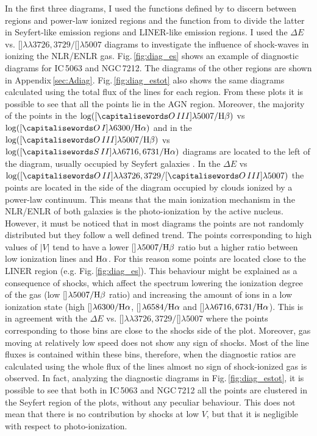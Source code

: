 \documentclass[../thesis.tex]{subfiles}
\begin{document}
In the first three diagrams, I used the functions defined by \citet{Kewley01} to discern between  regions and power-law ionized regions and the function from \citet{Kewley06} to divide the latter in Seyfert-like emission regions and LINER-like emission regions.
I used the $\Delta E$ vs. []$\lambda\lambda3726,3729/$[]$\lambda5007$ diagrams to investigate the influence of shock-waves in ionizing the NLR/ENLR gas.
Fig.\,\ref{fig:diag_es} shows an example of diagnostic diagrams for IC\,5063 and NGC\,7212.
The diagrams of the other regions are shown in Appendix\,\ref{sec:Adiag}.
Fig.\,\ref{fig:diag_estot} also shows the same diagrams calculated using the total flux of the lines for each region.
From these plots it is possible to see that all the points lie in the AGN region.
Moreover, the majority of the points in the $\log([\ion{O}{III}]\lambda5007/\Hb)$ vs $\log([\ion{O}{I}]\lambda6300/\Ha)$ and in the $\log([\ion{O}{III}]\lambda5007/\Hb)$ vs $\log([\ion{S}{II}]\lambda\lambda6716,6731/\Ha)$ diagrams are located to the left of the diagram, usually occupied by Seyfert galaxies \citep{Kewley06}.
In the $\Delta E$ vs $\log([\ion{O}{II}]\lambda\lambda3726,3729/[\ion{O}{III}]\lambda5007)$ the points are located in the side of the diagram occupied by clouds ionized by a power-law continuum.
This means that the main ionization mechanism in the NLR/ENLR of both galaxies is the photo-ionization by the active nucleus.
However, it must be noticed that in most diagrams the points are not randomly distributed but they follow a well defined trend.
The points corresponding to high values of $\lvert V \lvert$ tend to have a lower []$\lambda5007/\rm H\beta$ ratio but a higher ratio between low ionization lines and $\rm H\alpha$.  
For this reason some points are located close to the LINER region (e.g. Fig.\,\ref{fig:diag_es}).
This behaviour might be explained as a consequence of shocks, which affect the spectrum lowering the ionization degree of the gas (low []$\lambda5007/\rm H\beta$ ratio) and increasing the amount of ions in a low ionization state (high []$\lambda6300/\rm H\alpha$, []$\lambda6584/\rm H\alpha$ and []$\lambda\lambda6716,6731/\rm H\alpha$).
This is in agreement with the $\Delta E$ vs. []$\lambda\lambda3726,3729/$[]$\lambda5007$ where the points corresponding to those bins are close to the shocks side of the plot.
Moreover, gas moving at relatively low speed does not show any sign of shocks.
Most of the line fluxes is contained within these bins, therefore, when the diagnostic ratios are calculated using the whole flux of the lines almost no sign of shock-ionized gas is observed.
In fact, analyzing the diagnostic diagrams in Fig.\,\ref{fig:diag_estot}, it is possible to see that both in IC\,5063 and NGC\,7212 all the points are clustered in the Seyfert region of the plots, without any peculiar behaviour.
This does not mean that there is no contribution by shocks at low $V$, but that it is negligible with respect to photo-ionization. 
\end{document}

